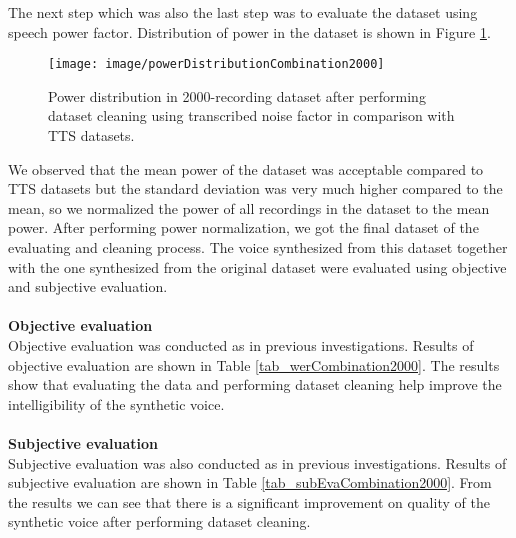\documentclass[12pt]{article}
\begin{document}
The next step which was also the last step was to evaluate the dataset using speech power factor. Distribution of power in the dataset is shown in Figure \ref{fig_powerDistributionCombination2000}.

\begin{figure}[t]
\begin{center}
\texttt{[image: image/powerDistributionCombination2000]}
\end{center}
\vspace{-0.3cm}
\caption[Power distribution in 2000-recording dataset after performing dataset cleaning using transcribed noise factor in comparison with TTS datasets.]{Power distribution in 2000-recording dataset after performing dataset cleaning using transcribed noise factor in comparison with TTS datasets.}
\label{fig_powerDistributionCombination2000}
\end{figure}

We observed that the mean power of the dataset was acceptable compared to TTS datasets but the standard deviation was very much higher compared to the mean, so we normalized the power of all recordings in the dataset to the mean power. After performing power normalization, we got the final dataset of the evaluating and cleaning process. The voice synthesized from this dataset together with the one synthesized from the original dataset were evaluated using objective and subjective evaluation.\\\\
\textbf{Objective evaluation}
\vspace{0.28cm}\\
Objective evaluation was conducted as in previous investigations. Results of objective evaluation are shown in Table \ref{tab_werCombination2000}. The results show that evaluating the data and performing dataset cleaning help improve the intelligibility of the synthetic voice.\\\\
\textbf{Subjective evaluation}
\vspace{0.28cm}\\
Subjective evaluation was also conducted as in previous investigations. Results of subjective evaluation are shown in Table \ref{tab_subEvaCombination2000}. From the results we can see that there is a significant improvement on quality of the synthetic voice after performing dataset cleaning.
\end{document}
